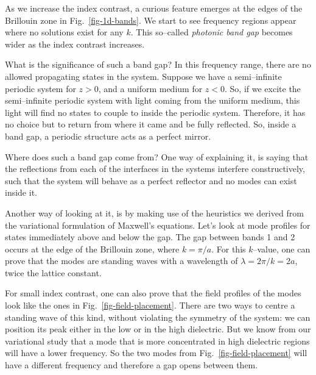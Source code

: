 As we increase the index contrast, a curious feature emerges at the edges of the Brillouin zone in Fig.~\ref{fig-1d-bands}. We start to see frequency regions appear where no solutions exist for any $k$. This so--called \emph{photonic band gap} becomes wider as the index contrast increases.

What is the significance of such a band gap? In this frequency range, there are no allowed propagating states in the system. Suppose we have a semi--infinite periodic system for $z>0$, and a uniform medium for $z<0$. So, if we excite the semi--infinite periodic system with light coming from the uniform medium, this light will find no states to couple to inside the periodic system. Therefore, it has no choice but to return from where it came and be fully reflected. So, inside a band gap, a periodic structure acts as a perfect mirror.

Where does such a band gap come from? One way of explaining it, is saying that the reflections from each of the interfaces in the systems interfere constructively, such that the system will behave as a perfect reflector and no modes can exist inside it.

Another way of looking at it, is by making use of the heuristics we derived from the variational formulation of Maxwell's equations. Let's look at mode profiles for states immediately above and below the gap. The gap between bands 1 and 2 occurs at the edge of the Brillouin zone, where $k = \pi / a$. For this $k$--value, one can prove that the modes are standing waves with a wavelength of $\lambda = 2 \pi / k = 2a$, twice the lattice constant.

For small index contrast, one can also prove that the field profiles of the modes look like the ones in Fig.~\ref{fig-field-placement}. There are two ways to centre a standing wave of this kind, without violating the symmetry of the system: we can position its peak either in the low or in the high dielectric. But we know from our variational study that a mode that is more concentrated in high dielectric regions will have a lower frequency. So the two modes from Fig.~\ref{fig-field-placement} will have a different frequency and therefore a gap opens between them.

